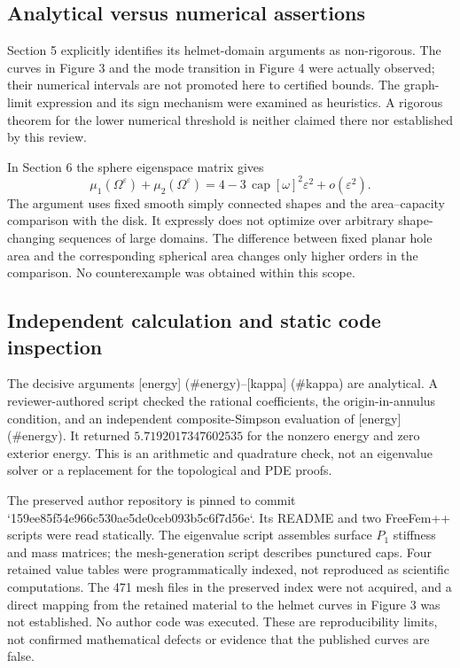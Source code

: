 \documentclass[10pt]{article}
\begin{document}
\subsection*{Analytical versus numerical assertions}
Section 5 explicitly identifies its helmet-domain arguments as non-rigorous. The curves in Figure 3 and the mode transition in Figure 4 were actually observed; their numerical intervals are not promoted here to certified bounds. The graph-limit expression and its sign mechanism were examined as heuristics. A rigorous theorem for the lower numerical threshold is neither claimed there nor established by this review.\par
In Section 6 the sphere eigenspace matrix gives \[\mu_1(\Omega^\varepsilon)+\mu_2(\Omega^\varepsilon)
 =4-3\,\operatorname{cap}[\omega]^2\varepsilon^2+o(\varepsilon^2).\] The argument uses fixed smooth simply connected shapes and the area–capacity comparison with the disk. It expressly does not optimize over arbitrary shape-changing sequences of large domains. The difference between fixed planar hole area and the corresponding spherical area changes only higher orders in the comparison. No counterexample was obtained within this scope.\par
\subsection*{Independent calculation and static code inspection}
The decisive arguments [energy] (\#energy)–[kappa] (\#kappa) are analytical. A reviewer-authored script checked the rational coefficients, the origin-in-annulus condition, and an independent composite-Simpson evaluation of [energy] (\#energy). It returned \(5.7192017347602535\) for the nonzero energy and zero exterior energy. This is an arithmetic and quadrature check, not an eigenvalue solver or a replacement for the topological and PDE proofs.\par
The preserved author repository is pinned to commit `159ee85f54e966c530ae5de0ceb093b5c6f7d56e`. Its README and two FreeFem++ scripts were read statically. The eigenvalue script assembles surface \(P_1\) stiffness and mass matrices; the mesh-generation script describes punctured caps. Four retained value tables were programmatically indexed, not reproduced as scientific computations. The 471 mesh files in the preserved index were not acquired, and a direct mapping from the retained material to the helmet curves in Figure 3 was not established. No author code was executed. These are reproducibility limits, not confirmed mathematical defects or evidence that the published curves are false.\par
\end{document}
